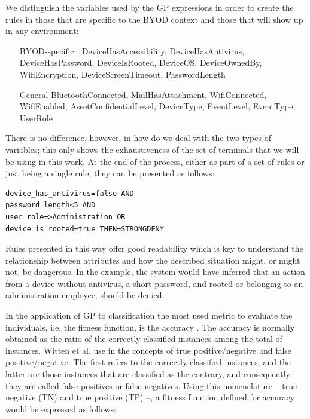 \documentclass[runningheads]{llncs}
\begin{document}
We distinguish the variables used by the GP expressions in order to create the rules
in those that are specific to the BYOD context and those
that will show up in any environment:
\begin{itemize}
  \item[BYOD-specific]: DeviceHasAccessibility, DeviceHasAntivirus,
    DeviceHasPassword, DeviceIsRooted, DeviceOS, DeviceOwnedBy,
    WifiEncryption, DeviceScreenTimeout, PasswordLength
  \item[General] BluetoothConnected, MailHasAttachment, WifiConnected, WifiEnabled,
    AssetConfidentialLevel, DeviceType, EventLevel, EventType, UserRole
  \end{itemize}

  There is no difference, however, in how do we deal with the two types of
  variables; this only shows the exhaustiveness of the set of terminals
  that we will be using in this work. At the end of the process, either as part of a set of rules or just being a single rule, they can be presented as follows:

\begin{verbatim}
device_has_antivirus=false AND
password_length<5 AND
user_role=>Administration OR
device_is_rooted=true THEN=STRONGDENY
\end{verbatim}

Rules presented in this way offer good readability which is key to understand the relationship between attributes and how the described situation might, or might not, be dangerous. In the example, the system would have inferred that an action from a device without antivirus, a short password, and rooted or belonging to an administration employee, should be denied.

\label{subsec:chossingfitness}

In the application of GP to classification
the most used metric to evaluate the individuals, i.e. the fitness function, is the accuracy
\cite{espejo2010survey}. The accuracy is normally obtained as the
ratio of the correctly classified instances among the total of
instances. Witten et al. use in \cite{witten2005data} the
concepts of true positive/negative and false positive/negative. The
first refers to the correctly classified instances, and the latter are
those instances that are classified as the contrary, and consequently they are called false positives
or false negatives. Using this nomenclature -- true negative (TN) and true positive (TP) --, a fitness function defined for
accuracy would be expressed as follows: 
\end{document}
